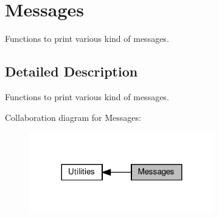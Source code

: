 \hypertarget{group__message__utils}{}\section{Messages}
\label{group__message__utils}


Functions to print various kind of messages.  




\subsection{Detailed Description}
Functions to print various kind of messages. 

Collaboration diagram for Messages\+:
\nopagebreak
\begin{figure}[H]
\begin{center}
\leavevmode
\includegraphics[width=228pt]{group__message__utils}
\end{center}
\end{figure}
